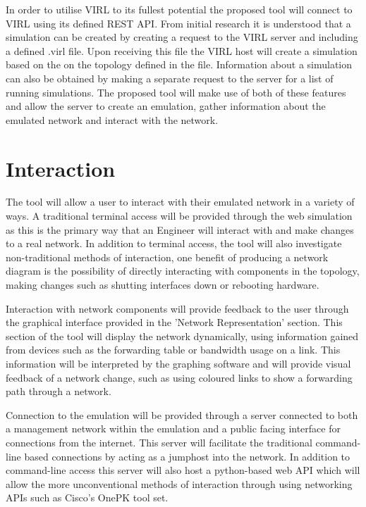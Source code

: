 \documentclass[11pt]{report}
\begin{document}
In order to utilise VIRL to its fullest potential the proposed tool will connect to VIRL using its defined REST API. From initial research it is understood that a simulation can be created by creating a request to the VIRL server and including a defined .virl file. Upon receiving this file the VIRL host will create a simulation based on the on the topology defined in the file. Information about a simulation can also be obtained by making a separate request to the server for a list of running simulations. The proposed tool will make use of both of these features and allow the server to create an emulation, gather information about the emulated network and interact with the network.

\section{Interaction}

The tool will allow a user to interact with their emulated network in a variety of ways. A traditional terminal access will be provided through the web simulation as this is the primary way that an Engineer will interact with and make changes to a real network. In addition to terminal access, the tool will also investigate non-traditional methods of interaction, one benefit of producing a network diagram is the possibility of directly interacting with components in the topology, making changes such as shutting interfaces down or rebooting hardware.

Interaction with network components will provide feedback to the user through the graphical interface provided in the 'Network Representation' section. This section of the tool will display the network dynamically, using information gained from devices such as the forwarding table or bandwidth usage on a link. This information will be interpreted by the graphing software and will provide visual feedback of a network change, such as using coloured links to show a forwarding path through a network.

Connection to the emulation will be provided through a server connected to both a management network within the emulation and a public facing interface for connections from the internet. This server will facilitate the traditional command-line based connections by acting as a jumphost into the network. In addition to command-line access this server will also host a python-based web API which will allow the more unconventional methods of interaction through using networking APIs such as Cisco's OnePK tool set.
\end{document}
